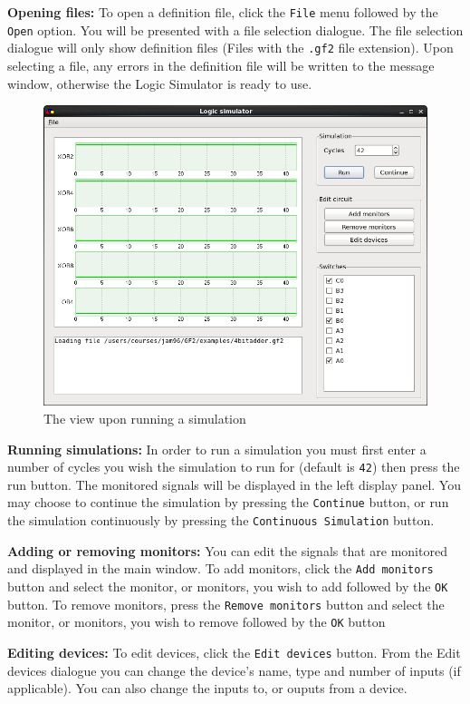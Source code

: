 \documentclass[a4paper,10pt]{article}
\begin{document}
\textbf{Opening files:} To open a definition file, click the \texttt{File} menu followed by the \texttt{Open} option. You will be presented with a file selection dialogue. The file selection dialogue will only show definition files (Files with the \texttt{.gf2} file extension). Upon selecting a file, any errors in the definition file will be written to the message window, otherwise the Logic Simulator is ready to use. 

\begin{figure}[h]
        \centering
        \includegraphics[width=.6\textwidth]{../../report2/jam96/simulation}
        \caption{The view upon running a simulation}
        \label{fig:simulation}
\end{figure}

\textbf{Running simulations:} In order to run a simulation you must first enter a number of cycles you wish the simulation to run for (default is \texttt{42}) then press the run button. The monitored signals will be displayed in the left display panel. You may choose to continue the simulation by pressing the \texttt{Continue} button, or run the simulation continuously by pressing the \texttt{Continuous Simulation} button.

\textbf{Adding or removing monitors:} You can edit the signals that are monitored and displayed in the main window. To add monitors, click the \texttt{Add monitors} button and select the monitor, or monitors, you wish to add followed by the \texttt{OK} button. To remove monitors, press the \texttt{Remove monitors} button and select the monitor, or monitors, you wish to remove followed by the \texttt{OK} button

\textbf{Editing devices:} To edit devices, click the \texttt{Edit devices} button. From the Edit devices dialogue you can change the device's name, type and number of inputs (if applicable). You can also change the inputs to, or ouputs from a device.
\end{document}
